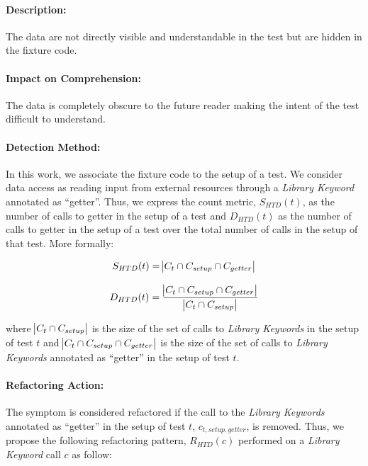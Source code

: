 \paragraph{Description:}

The data are not directly visible and understandable in the test but are hidden in the fixture code.

\paragraph{Impact on Comprehension:} 

The data is completely obscure to the future reader making the intent of the test difficult to understand.

\paragraph{Detection Method:}

In this work, we associate the fixture code to the setup of a test. We consider data access as reading input from external resources through a \emph{Library Keyword} annotated as ``getter''. Thus, we express the count metric, $S_{HTD}(t)$, as the number of calls to getter in the setup of a test and $D_{HTD}(t)$ as the number of calls to getter in the setup of a test over the total number of calls in the setup of that test. More formally:

\begin{equation*}
    S_{HTD}(t) = \abs{C_{t} \cap C_{setup} \cap C_{getter}}
\end{equation*}

\begin{equation*}
    D_{HTD}(t) = \frac{\abs{C_{t} \cap C_{setup} \cap C_{getter}}}{\abs{C_{t} \cap C_{setup}}}
\end{equation*}

where $\abs{C_{t} \cap C_{setup}}$ is the size of the set of calls to \emph{Library Keywords} in the setup of test $t$ and $\abs{C_{t} \cap C_{setup} \cap C_{getter}}$ is the size of the set of calls to \emph{Library Keywords} annotated as ``getter'' in the setup of test $t$.

\paragraph{Refactoring Action:}

The symptom is considered refactored if the call to the \emph{Library Keywords} annotated as ``getter'' in the setup of test $t$, $c_{t, setup, getter}$, is removed. Thus, we propose the following refactoring pattern, $R_{HTD}(c)$ performed on a \emph{Library Keyword} call $c$ as follow:

